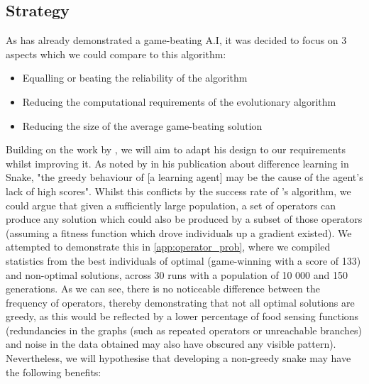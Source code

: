 \documentclass[british,10pt,a4paper]{article}
\begin{document}
\subsection{Strategy}
\label{subsec:strategy}
As \citet{Ehlis2000-sz} has already demonstrated a game-beating A.I, it was decided to focus on 3 aspects which we could compare to this algorithm:
\begin{itemize}
	\item Equalling or beating the reliability of the algorithm
	\item Reducing the computational requirements of the evolutionary algorithm
	\item Reducing the size of the average game-beating solution
\end{itemize}
Building on the work by \citeauthor{Ehlis2000-sz}, we will aim to adapt his design to our requirements whilst improving it. As noted by \citet{Christopher_Lockhart2010-em} in his publication about difference learning in Snake, "the greedy behaviour of [a learning agent] may be the cause of the agent's lack of high scores". Whilst this conflicts by the success rate of \citeauthor{Ehlis2000-sz}'s algorithm, we could argue that given a sufficiently large population, a set of operators can produce any solution which could also be produced by a subset of those operators (assuming a fitness function which drove individuals up a gradient existed). We attempted to demonstrate this in \autoref{app:operator_prob}, where we compiled statistics from the best individuals of optimal (game-winning with a score of 133) and non-optimal solutions, across 30 runs with a population of 10 000 and 150 generations. As we can see, there is no noticeable difference between the frequency of operators, thereby demonstrating that not all optimal solutions are greedy, as this would be reflected by a lower percentage of food sensing functions (redundancies in the graphs (such as repeated operators or unreachable branches) and noise in the data obtained may also have obscured any visible pattern). Nevertheless, we will hypothesise that developing a non-greedy snake may have the following benefits:
\end{document}
